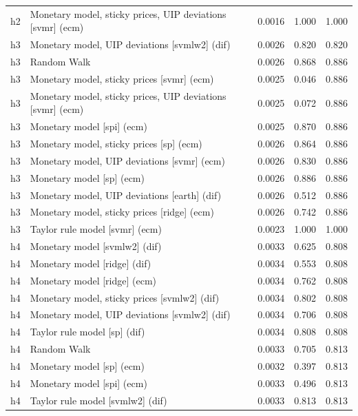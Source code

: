 \begin{ThreePartTable}
\begin{longtable}[t]{cp{5.5cm}ccc}
h2 & \raggedright Monetary model, sticky prices, UIP deviations [svmr] (ecm) & 0.0016 & 1.000 & 1.000\\
\addlinespace
h3 & \raggedright Monetary model, UIP deviations [svmlw2] (dif) & 0.0026 & 0.820 & 0.820\\
h3 & \raggedright Random Walk & 0.0026 & 0.868 & 0.886\\
h3 & \raggedright Monetary model, sticky prices [svmr] (ecm) & 0.0025 & 0.046 & 0.886\\
h3 & \raggedright Monetary model, sticky prices, UIP deviations [svmr] (ecm) & 0.0025 & 0.072 & 0.886\\
h3 & \raggedright Monetary model [spi] (ecm) & 0.0025 & 0.870 & 0.886\\
h3 & \raggedright Monetary model, sticky prices [sp] (ecm) & 0.0026 & 0.864 & 0.886\\
h3 & \raggedright Monetary model, UIP deviations [svmr] (ecm) & 0.0026 & 0.830 & 0.886\\
h3 & \raggedright Monetary model [sp] (ecm) & 0.0026 & 0.886 & 0.886\\
h3 & \raggedright Monetary model, UIP deviations [earth] (dif) & 0.0026 & 0.512 & 0.886\\
h3 & \raggedright Monetary model, sticky prices [ridge] (ecm) & 0.0026 & 0.742 & 0.886\\
h3 & \raggedright Taylor rule model [svmr] (ecm) & 0.0023 & 1.000 & 1.000\\
\addlinespace
h4 & \raggedright Monetary model [svmlw2] (dif) & 0.0033 & 0.625 & 0.808\\
h4 & \raggedright Monetary model [ridge] (dif) & 0.0034 & 0.553 & 0.808\\
h4 & \raggedright Monetary model [ridge] (ecm) & 0.0034 & 0.762 & 0.808\\
h4 & \raggedright Monetary model, sticky prices [svmlw2] (dif) & 0.0034 & 0.802 & 0.808\\
h4 & \raggedright Monetary model, UIP deviations [svmlw2] (dif) & 0.0034 & 0.706 & 0.808\\
h4 & \raggedright Taylor rule model [sp] (dif) & 0.0034 & 0.808 & 0.808\\
h4 & \raggedright Random Walk & 0.0033 & 0.705 & 0.813\\
h4 & \raggedright Monetary model [sp] (ecm) & 0.0032 & 0.397 & 0.813\\
h4 & \raggedright Monetary model [spi] (ecm) & 0.0033 & 0.496 & 0.813\\
h4 & \raggedright Taylor rule model [svmlw2] (dif) & 0.0033 & 0.813 & 0.813\\

\end{longtable}
\end{ThreePartTable}
